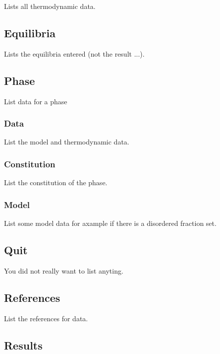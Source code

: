 \documentclass[12pt]{article}
\begin{document}
Lists all thermodynamic data.

\subsection{Equilibria}

Lists the equilibria entered (not the result ...).

\subsection{Phase}

List data for a phase

\subsubsection{Data}

List the model and thermodynamic data.

\subsubsection{Constitution}

List the constitution of the phase.

\subsubsection{Model}

List some model data for axample if there is a disordered fraction set.

\subsection{Quit}

You did not really want to list anyting.

\subsection{References}

List the references for data.

\subsection{Results}
\end{document}
